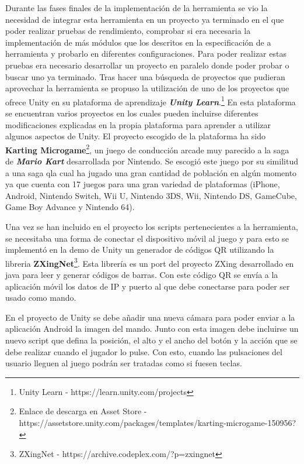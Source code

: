 Durante las fases finales de la implementaci\'on de la herramienta se vio la necesidad de integrar esta herramienta en un proyecto ya terminado en el que poder realizar pruebas de rendimiento, comprobar si era necesaria la implementaci\'on de m\'as m\'odulos que los descritos en la especificaci\'on de a herramienta y probarlo en diferentes configuraciones. Para poder realizar estas pruebas era necesario desarrollar un proyecto en paralelo donde poder probar o buscar uno ya terminado. Tras hacer una b\'usqueda de proyectos que pudieran aprovechar la herramienta se propuso la utilizaci\'on de uno de los proyectos que ofrece Unity en su plataforma de aprendizaje \textbf{\textit{Unity Learn}}.\footnote{Unity Learn - https://learn.unity.com/projects} En esta plataforma se encuentran varios proyectos en los cuales pueden incluirse diferentes modificaciones explicadas en la propia plataforma para aprender a utilizar algunos aspectos de Unity. El proyecto escogido de la plataforma ha sido \textbf{Karting Microgame}\footnote{Enlace de descarga en Asset Store - https://assetstore.unity.com/packages/templates/karting-microgame-150956?}, un juego de conducci\'on arcade muy parecido a la saga de \textbf{\textit{Mario Kart}} desarrollada por Nintendo. Se escogi\'o este juego por su similitud a una saga qla cual ha jugado una gran cantidad de poblaci\'on en alg\'un momento ya que cuenta con 17 juegos para una gran variedad de plataformas (iPhone, Android, Nintendo Switch, Wii U, Nintendo 3DS, Wii, Nintendo DS, GameCube, Game Boy Advance y Nintendo 64).

Una vez se han incluido en el proyecto los scripts pertenecientes a la herramienta, se necesitaba una forma de conectar el dispositivo m\'ovil al juego y para esto se implement\'o en la demo de Unity un generador de c\'odigos QR utilizando la libreria \textbf{ZXingNet}\footnote{ZXingNet - https://archive.codeplex.com/?p=zxingnet}. Esta librer\'ia es un port del proyecto ZXing desarrollado en java para leer y generar c\'odigos de barras. Con este c\'odigo QR se env\'ia a la aplicaci\'on m\'ovil los datos de IP y puerto al que debe conectarse para poder ser usado como mando. 

En el proyecto de Unity se debe a\~nadir una nueva c\'amara para poder enviar a la aplicaci\'on Android la imagen del mando. Junto con esta imagen debe incluirse un nuevo script que defina la posici\'on, el alto y el ancho del bot\'on y la acci\'on que se debe realizar cuando el jugador lo pulse. Con esto, cuando las pulsaciones del usuario lleguen al juego podr\'an ser tratadas como si fuesen teclas. 

